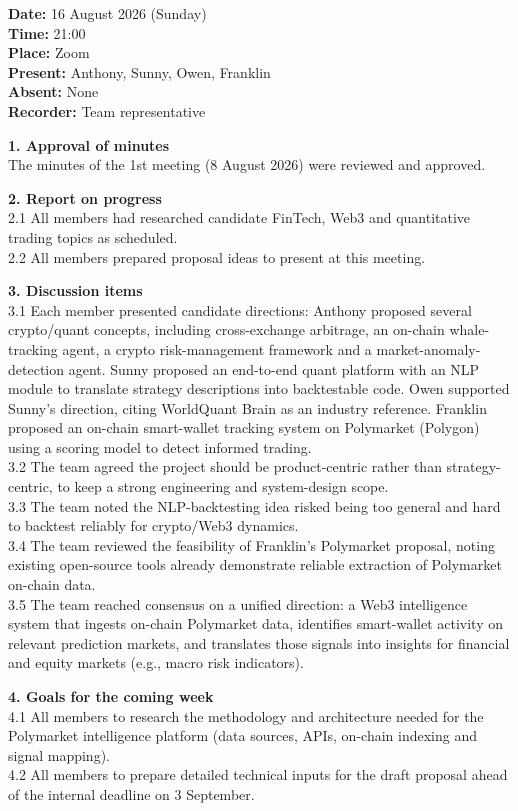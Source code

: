 \textbf{Date:} 16 August 2026 (Sunday) \\
\textbf{Time:} 21:00 \\
\textbf{Place:} Zoom \\
\textbf{Present:} Anthony, Sunny, Owen, Franklin \\
\textbf{Absent:} None \\
\textbf{Recorder:} Team representative

\textbf{1. Approval of minutes} \\
The minutes of the 1st meeting (8 August 2026) were reviewed and approved.

\textbf{2. Report on progress} \\
2.1 All members had researched candidate FinTech, Web3 and quantitative trading topics as scheduled. \\
2.2 All members prepared proposal ideas to present at this meeting.

\textbf{3. Discussion items} \\
3.1 Each member presented candidate directions: Anthony proposed several crypto/quant concepts, including cross-exchange arbitrage, an on-chain whale-tracking agent, a crypto risk-management framework and a market-anomaly-detection agent. Sunny proposed an end-to-end quant platform with an NLP module to translate strategy descriptions into backtestable code. Owen supported Sunny's direction, citing WorldQuant Brain as an industry reference. Franklin proposed an on-chain smart-wallet tracking system on Polymarket (Polygon) using a scoring model to detect informed trading. \\
3.2 The team agreed the project should be product-centric rather than strategy-centric, to keep a strong engineering and system-design scope. \\
3.3 The team noted the NLP-backtesting idea risked being too general and hard to backtest reliably for crypto/Web3 dynamics. \\
3.4 The team reviewed the feasibility of Franklin's Polymarket proposal, noting existing open-source tools already demonstrate reliable extraction of Polymarket on-chain data. \\
3.5 The team reached consensus on a unified direction: a Web3 intelligence system that ingests on-chain Polymarket data, identifies smart-wallet activity on relevant prediction markets, and translates those signals into insights for financial and equity markets (e.g., macro risk indicators).

\textbf{4. Goals for the coming week} \\
4.1 All members to research the methodology and architecture needed for the Polymarket intelligence platform (data sources, APIs, on-chain indexing and signal mapping). \\
4.2 All members to prepare detailed technical inputs for the draft proposal ahead of the internal deadline on 3 September.

